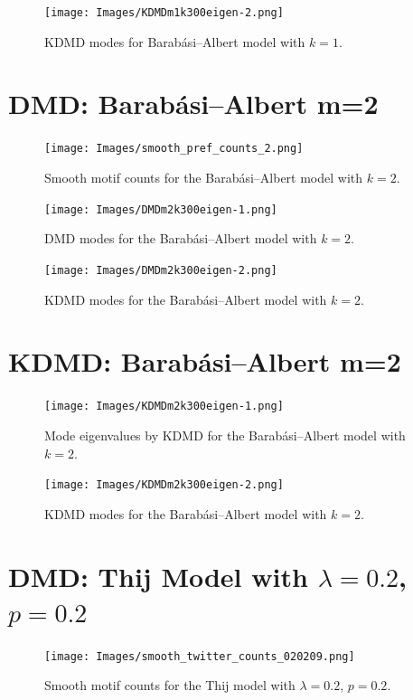 \begin{figure}
    \texttt{[image: Images/KDMDm1k300eigen-2.png]}
    \centering
    \caption{KDMD modes for Barabási–Albert model
    with $k=1$.}
\end{figure}

\clearpage

\FloatBarrier

\section{DMD: Barabási–Albert m=2}

\begin{figure}
    \texttt{[image: Images/smooth\_pref\_counts\_2.png]}
    \centering
    \caption{Smooth motif counts for the Barabási–Albert model with $k=2$.}
\end{figure}

\clearpage
\begin{figure}
    \texttt{[image: Images/DMDm2k300eigen-1.png]}
    \centering
    \caption{DMD modes for the Barabási–Albert model
    with $k=2$.}
\end{figure}

\begin{figure}
    \texttt{[image: Images/DMDm2k300eigen-2.png]}
    \centering
    \caption{KDMD modes for the Barabási–Albert model
    with $k=2$.}
\end{figure}

\clearpage

\section{KDMD: Barabási–Albert m=2}

\begin{figure}
    \texttt{[image: Images/KDMDm2k300eigen-1.png]}
    \centering
    \caption{Mode eigenvalues by KDMD for the Barabási–Albert model
    with $k=2$.}
\end{figure}

\begin{figure}
    \texttt{[image: Images/KDMDm2k300eigen-2.png]}
    \centering
    \caption{KDMD modes for the Barabási–Albert model
    with $k=2$.}
\end{figure}

\clearpage

\section{DMD: Thij Model with $\lambda=0.2$, $p=0.2$}
\begin{figure}
    \texttt{[image: Images/smooth\_twitter\_counts\_020209.png]}
    \centering
    \caption{Smooth motif counts for the Thij model
    with $\lambda=0.2$, $p=0.2$.}
    \label{fig:pthij0202}
\end{figure}


